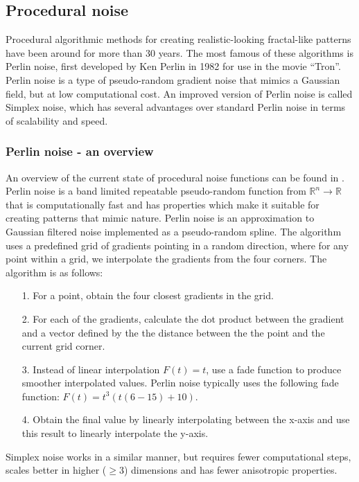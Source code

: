 \documentclass[aps,pre,twocolumn,letterpaper,floatfix,showpacs]{revtex4}
\begin{document}
\subsection{Procedural noise}
\label{sec:perlin}

Procedural algorithmic methods for creating realistic-looking
fractal-like patterns have been around for more than 30 years. The most famous of these
algorithms is Perlin noise, first developed by Ken Perlin in 1982 for
use in the movie ``Tron''.  Perlin noise is a type of pseudo-random
gradient noise that mimics a Gaussian field, but at low computational cost. 
An improved version of Perlin noise is called Simplex
noise, which has several advantages over standard Perlin noise in
terms of scalability and speed.  


\subsubsection{Perlin noise - an overview}
An overview of the current state of procedural noise functions can be
found in \cite{lagae:2010}.  Perlin noise \citep{perlin:2002} 
is a band limited repeatable pseudo-random function
from $\mathbb R^n \to \mathbb R$ that is computationally fast and has
properties which make it suitable for creating patterns that mimic
nature. Perlin noise is an approximation to Gaussian filtered noise
implemented as a pseudo-random spline. The algorithm uses a predefined
grid of gradients pointing in a random direction, where for any point
within a grid, we interpolate the gradients from the four corners. The
algorithm is as follows:
\begin{itemize}
  \item[1.] For a point, obtain the four closest gradients in the grid.
   \item [2.] For each of the gradients, calculate the dot product
     between the gradient and a vector defined by the  the distance
     between the the point and the current grid corner. 
   \item [3.] Instead of linear interpolation $F(t) = t$, use a fade function to produce smoother interpolated values. Perlin noise typically uses the following fade function: $F(t) = t ^3 (t  (6 - 15) + 10)$.
    \item [4.] Obtain the final value by linearly interpolating between the x-axis and
      use this result to linearly interpolate the y-axis. 
\end{itemize} 
Simplex noise works in a similar manner, but requires fewer
computational steps, scales better in higher ($\ge 3$) dimensions and has fewer 
anisotropic properties. 
\end{document}
